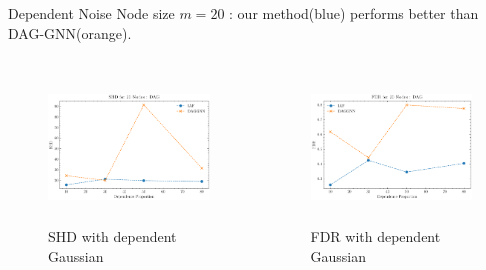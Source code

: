 \documentclass{beamer}
\begin{document}
\begin{frame}[allowframebreaks]{Dependent Noise}
    Node size $m=20$ : our method(blue) performs better than DAG-GNN(orange).
    \begin{columns}
        \begin{column}{0.5\textwidth}
            \begin{figure}
                \centering
                \includegraphics[height=4cm]{fig/SHD_dependence_20_DAG_threshold0.3.pdf}
                \caption{SHD with dependent Gaussian}
                \label{fig:dep_gaussian_shd_20}
            \end{figure}
        \end{column}
        \begin{column}{0.5\textwidth}
            \begin{figure}
                \centering
                \includegraphics[height=4cm]{fig/FDR_dependence_20_DAG_threshold0.3.pdf}
                \caption{FDR with dependent Gaussian}
                \label{fig:dep_gaussian_fdr_20}
            \end{figure}
        \end{column}
    \end{columns}
    \framebreak


\end{frame}
\end{document}
